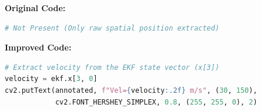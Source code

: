 \begin{itemize}
    \textbf{Original Code:}
    \begin{lstlisting}[language=Python]
# Not Present (Only raw spatial position extracted)
    \end{lstlisting}
    
    \textbf{Improved Code:}
    \begin{lstlisting}[language=Python]
# Extract velocity from the EKF state vector (x[3])
velocity = ekf.x[3, 0]
cv2.putText(annotated, f"Vel={velocity:.2f} m/s", (30, 150),
            cv2.FONT_HERSHEY_SIMPLEX, 0.8, (255, 255, 0), 2)
    \end{lstlisting}
\end{itemize}
